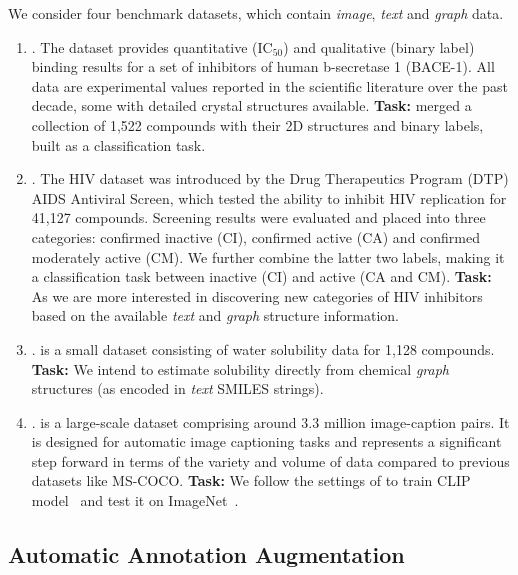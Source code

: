 We consider four benchmark datasets, which contain \emph{image}, \emph{text} and \emph{graph} data. 
\begin{enumerate}[leftmargin=*]\itemsep0em
    \item \bace. The \bace dataset provides quantitative ($\mathrm{IC}_{50}$) and qualitative (binary label) binding results for a set of inhibitors of human b-secretase 1 (BACE-1). 
    All data are experimental values reported in the scientific literature over the past decade, some with detailed crystal structures available. 
    \textbf{Task:} \bace merged a collection of 1,522 compounds with their 2D structures and binary labels, built as a classification task. 
    \item \hiv. The HIV dataset was introduced by the Drug Therapeutics Program (DTP) AIDS Antiviral Screen, which tested the ability to inhibit HIV replication for 41,127 compounds. 
    Screening results were evaluated and placed into three categories: confirmed inactive (CI), confirmed active (CA) and confirmed moderately active (CM).
    We further combine the latter two labels, making it a classification task between inactive (CI) and active (CA and CM). 
    \textbf{Task:} As we are more interested in discovering new categories of HIV inhibitors based on the available \emph{text} and \emph{graph} structure information.  
    \item \esol. \esol is a small dataset consisting of water solubility data for 1,128 compounds. 
    \textbf{Task:} We intend to estimate solubility directly from chemical \emph{graph} structures (as encoded in \emph{text} SMILES strings). 
    \item \image. \image is a large-scale dataset comprising around $3.3$ million image-caption pairs. 
    It is designed for automatic image captioning tasks and represents a significant step forward in terms of the variety and volume of data compared to previous datasets like MS-COCO. 
    \textbf{Task:} We follow the settings of \cite{FKIKT23} to train CLIP model~\cite{RKHRGASAMCKS21} and test it on ImageNet~\cite{DDSLLF09}. 
\end{enumerate}

\subsection{Automatic Annotation Augmentation}
\label{subsec:appendix_auto_annotation_augmentation}


